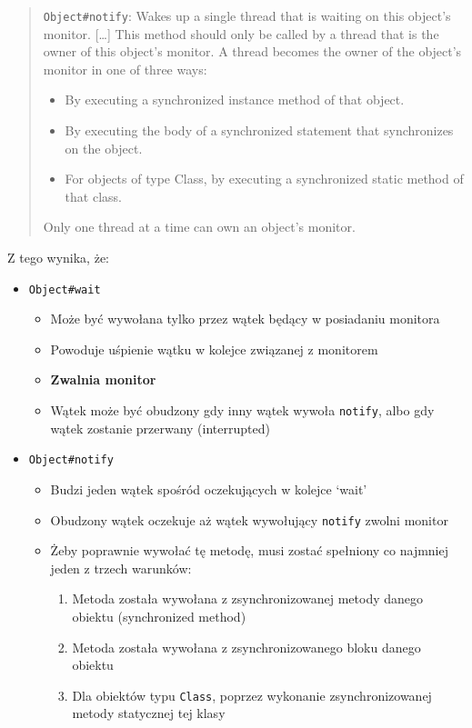 \documentclass[11pt]{article}
\providecommand{\tightlist}{%
      \setlength{\itemsep}{0pt}\setlength{\parskip}{0pt}}
\begin{document}
\begin{quote}
\texttt{Object\#notify}: Wakes up a single thread that is waiting on
this object's monitor. {[}\ldots{]} This method should only be called by
a thread that is the owner of this object's monitor. A thread becomes
the owner of the object's monitor in one of three ways:

\begin{itemize}
\tightlist
\item
  By executing a synchronized instance method of that object.
\item
  By executing the body of a synchronized statement that synchronizes on
  the object.
\item
  For objects of type Class, by executing a synchronized static method
  of that class.
\end{itemize}

Only one thread at a time can own an object's monitor.
\end{quote}

Z tego wynika, że:

\begin{itemize}
\tightlist
\item
  \texttt{Object\#wait}

  \begin{itemize}
  \tightlist
  \item
    Może być wywołana tylko przez wątek będący w posiadaniu monitora
  \item
    Powoduje uśpienie wątku w kolejce związanej z monitorem
  \item
    \textbf{Zwalnia monitor}
  \item
    Wątek może być obudzony gdy inny wątek wywoła \texttt{notify}, albo
    gdy wątek zostanie przerwany (interrupted)
  \end{itemize}
\item
  \texttt{Object\#notify}

  \begin{itemize}
  \tightlist
  \item
    Budzi jeden wątek spośród oczekujących w kolejce `wait'
  \item
    Obudzony wątek oczekuje aż wątek wywołujący \texttt{notify} zwolni
    monitor
  \item
    Żeby poprawnie wywołać tę metodę, musi zostać spełniony co najmniej
    jeden z trzech warunków:

    \begin{enumerate}
    \def\labelenumi{\arabic{enumi}.}
    \tightlist
    \item
      Metoda została wywołana z zsynchronizowanej metody danego obiektu
      (synchronized method)
    \item
      Metoda została wywołana z zsynchronizowanego bloku danego obiektu
    \item
      Dla obiektów typu \texttt{Class}, poprzez wykonanie
      zsynchronizowanej metody statycznej tej klasy
    \end{enumerate}
  \end{itemize}
\end{itemize}
\end{document}
